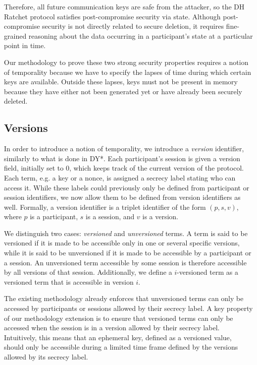 Therefore, all future communication keys are safe from the attacker, so the DH Ratchet protocol satisfies post-compromise security via state.
Although post-compromise security is not directly related to secure deletion, it requires fine-grained reasoning about the data occurring in a participant's state at a particular point in time.

Our methodology to prove these two strong security properties requires a notion of temporality because we have to specify the lapses of time during which certain keys are available. Outside these lapses, keys must not be present in memory because they have either not been generated yet or have already been securely deleted.

\subsection{Versions}
\label{sec:versions}

In order to introduce a notion of temporality, we introduce a \emph{version} identifier, similarly to what is done in DY*. Each participant's session is given a version field, initially set to $0$, which keeps track of the current version of the protocol.
Each term, e.g. a key or a nonce, is assigned a secrecy label stating who can access it. While these labels could previously only be defined from participant or session identifiers, we now allow them to be defined from version identifiers as well. Formally, a version identifier is a triplet identifier of the form $(p, s, v)$, where $p$ is a participant, $s$ is a session, and $v$ is a version.

We distinguish two cases: \emph{versioned} and \emph{unversioned} terms.
A term is said to be versioned if it is made to be accessible only in one or several specific versions, while it is said to be unversioned if it is made to be accessible by a participant or a session. 
An unversioned term accessible by some session is therefore accessible by all versions of that session.
Additionally, we define a $i$-versioned term as a versioned term that is accessible in version $i$.

The existing methodology already enforces that unversioned terms can only be accessed by participants or sessions allowed by their secrecy label.
A key property of our methodology extension is to ensure that versioned terms can only be accessed when the session is in a version allowed by their secrecy label. Intuitively, this means that an ephemeral key, defined as a versioned value, should only be accessible during a limited time frame defined by the versions allowed by its secrecy label.

